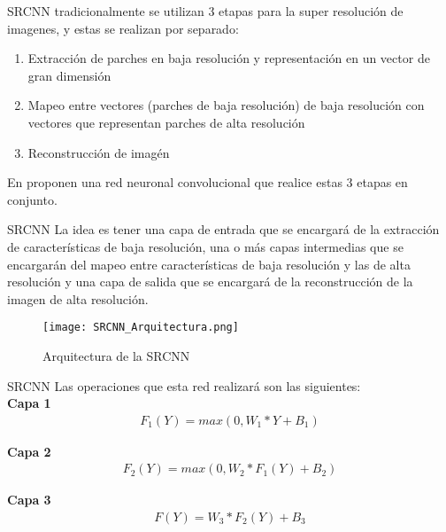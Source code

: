 \begin{frame}{SRCNN}
    tradicionalmente se utilizan 3 etapas para la super resolución de imagenes, y estas se realizan por separado:
    \begin{enumerate}
        \item Extracción de parches en baja resolución y representación en un vector de gran dimensión
        \item Mapeo entre vectores (parches de baja resolución) de baja resolución con vectores que representan parches de alta
        resolución
        \item Reconstrucción de imagén
    \end{enumerate}
    \pause
    En \cite{SRCNN} proponen una red neuronal convolucional que realice estas 3 etapas en conjunto.
\end{frame}

\begin{frame}{SRCNN}
    La idea es tener una capa de entrada que se encargará de la extracción de características de baja resolución,
    una o más capas intermedias que se encargarán del mapeo entre características de baja resolución y las de alta resolución y
    una capa de salida que se encargará de la reconstrucción de la imagen de alta resolución.
    \begin{figure}[H]
        \label{fig:SRCNN_Arquitectura}
        \centering
        \texttt{[image: SRCNN\_Arquitectura.png]}
        \caption{Arquitectura de la SRCNN}
    \end{figure}
\end{frame}

\begin{frame}{SRCNN}
    Las operaciones que esta red realizará son las siguientes:\\
    \textbf{Capa 1}
    \begin{align}
        \label{eqn:SRCNN_FirstLayer}
        F_1(Y)=max(0,W_1*Y+B_1)
    \end{align}

    \textbf{Capa 2}
    \begin{align}
        \label{eqn:SRCNN_SecondLayer}
        F_2(Y)=max(0,W_2*F_1(Y)+B_2)
    \end{align}

    \textbf{Capa 3}
    \begin{align}
        \label{eqn:SRCNN_ThirdLayer}
        F(Y)=W_3*F_2(Y)+B_3
    \end{align}
\end{frame}